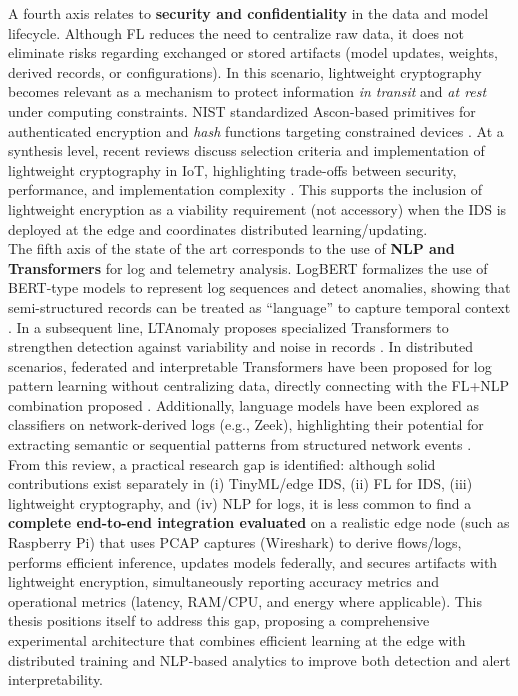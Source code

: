 A fourth axis relates to \textbf{security and confidentiality} in the data and model lifecycle. Although FL reduces the need to centralize raw data, it does not eliminate risks regarding exchanged or stored artifacts (model updates, weights, derived records, or configurations). In this scenario, lightweight cryptography becomes relevant as a mechanism to protect information \textit{in transit} and \textit{at rest} under computing constraints. NIST standardized Ascon-based primitives for authenticated encryption and \textit{hash} functions targeting constrained devices \cite{NIST_SP800232_2025}. At a synthesis level, recent reviews discuss selection criteria and implementation of lightweight cryptography in IoT, highlighting trade-offs between security, performance, and implementation complexity \cite{Gusita2025_LWC_Survey}. This supports the inclusion of lightweight encryption as a viability requirement (not accessory) when the IDS is deployed at the edge and coordinates distributed learning/updating.\\

The fifth axis of the state of the art corresponds to the use of \textbf{NLP and Transformers} for log and telemetry analysis. LogBERT formalizes the use of BERT-type models to represent log sequences and detect anomalies, showing that semi-structured records can be treated as ``language'' to capture temporal context \cite{LogBERT2021}. In a subsequent line, LTAnomaly proposes specialized Transformers to strengthen detection against variability and noise in records \cite{LTAnomaly2023}. In distributed scenarios, federated and interpretable Transformers have been proposed for log pattern learning without centralizing data, directly connecting with the FL+NLP combination proposed \cite{NDSS2022_FedTransLog}. Additionally, language models have been explored as classifiers on network-derived logs (e.g., Zeek), highlighting their potential for extracting semantic or sequential patterns from structured network events \cite{Yadav2023_LLM_Zeek}.\\

From this review, a practical research gap is identified: although solid contributions exist separately in (i) TinyML/edge IDS, (ii) FL for IDS, (iii) lightweight cryptography, and (iv) NLP for logs, it is less common to find a \textbf{complete end-to-end integration evaluated} on a realistic edge node (such as Raspberry Pi) that uses PCAP captures (Wireshark) to derive flows/logs, performs efficient inference, updates models federally, and secures artifacts with lightweight encryption, simultaneously reporting accuracy metrics and operational metrics (latency, RAM/CPU, and energy where applicable). This thesis positions itself to address this gap, proposing a comprehensive experimental architecture that combines efficient learning at the edge with distributed training and NLP-based analytics to improve both detection and alert interpretability.\\


